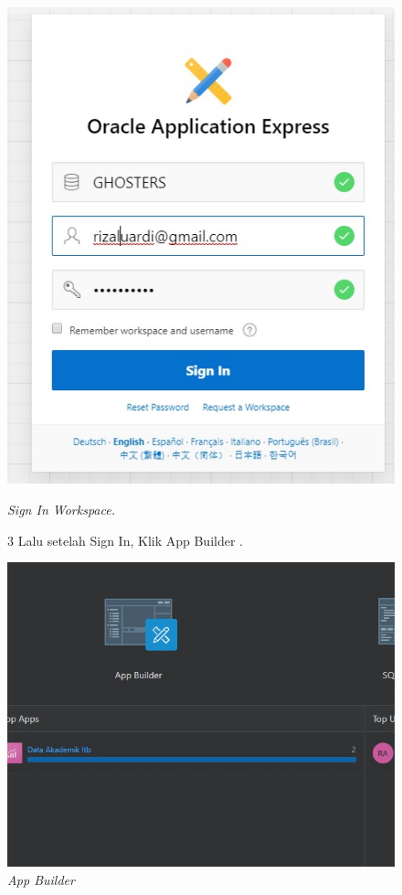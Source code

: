 \begin{enumerate}
\begin{figure}[!htbp]
    \begin{center}
    \includegraphics[scale=0.5]{figures/2.jpg}
    \caption{\textit{Sign In Workspace.}}
    \end{center}


\item[3] Lalu setelah Sign In, Klik App Builder .

    \begin{center}
\includegraphics[scale=0.5]{figures/3.jpg}
    \caption{\textit{App Builder}}
        \end{center}
\label{gambar}
\end{figure}


\end{enumerate}
